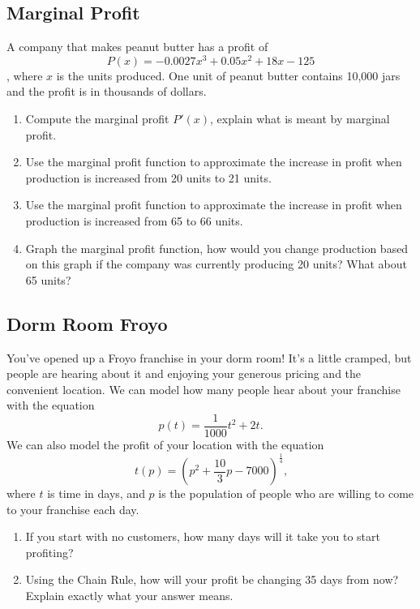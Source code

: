 \documentclass{ximera}
\begin{document}
\subsection{Marginal Profit}
A company that makes peanut butter has a profit of $$P(x)=-0.0027x^3+0.05x^2+18x-125$$, where $x$ is the units produced. One unit of peanut butter contains 10,000 jars and the profit is in thousands of dollars.
\begin{enumerate}
\item{Compute the marginal profit $P'(x)$, explain what is meant by marginal profit.} 
\item{Use the marginal profit function to approximate the increase in profit when production is increased from 20 units to 21 units.}
\item{Use the marginal profit function to approximate the increase in profit when production is increased from 65 to 66 units.}
\item{Graph the marginal profit function, how would you change production based on this graph if the company was currently producing 20 units? What about 65 units?}
\end{enumerate}

\subsection{Dorm Room Froyo}
You've opened up a Froyo franchise in your dorm room! It's a little cramped, but people are hearing about it and enjoying your generous pricing and the convenient location. We can model how many people hear about your franchise with the equation $$p(t) = \frac{1}{1000}t^2 + 2t \text{.}$$ We can also model the profit of your location with the equation $$t(p) = (p^2 + \frac{10}{3}p - 7000)^{\frac{1}{4}} \text{,}$$ where $t$ is time in days, and $p$ is the population of people who are willing to come to your franchise each day.

\begin{enumerate}
\item{If you start with no customers, how many days will it take you to start profiting?}
\item{Using the Chain Rule, how will your profit be changing 35 days from now? Explain exactly what your answer means.}
\end{enumerate}
\pagebreak
\end{document}
